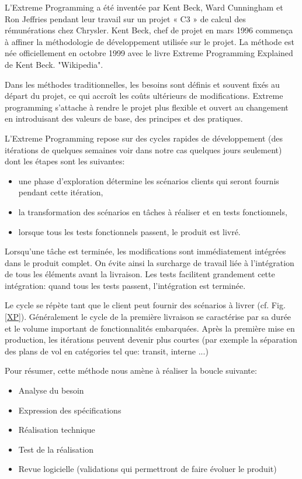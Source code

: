 L'Extreme Programming a été inventée par Kent Beck, Ward Cunningham et Ron Jeffries pendant leur travail sur un projet « C3 » de calcul des rémunérations chez Chrysler. Kent Beck, chef de projet en mars 1996 commença à affiner la méthodologie de développement utilisée sur le projet. La méthode est née officiellement en octobre 1999 avec le livre Extreme Programming Explained de Kent Beck. "Wikipedia".

Dans les méthodes traditionnelles, les besoins sont définis et souvent fixés au départ du projet, ce qui accroît les coûts ultérieurs de modifications. Extreme programming s'attache à rendre le projet plus flexible et ouvert au changement en introduisant des valeurs de base, des principes et des pratiques.

L'Extreme Programming repose sur des cycles rapides de développement (des itérations de quelques semaines voir dans notre cas quelques jours seulement) dont les étapes sont les suivantes:
\begin{itemize}
\item une phase d'exploration détermine les scénarios clients qui seront fournis pendant cette itération,
\item la transformation des scénarios en tâches à réaliser et en tests fonctionnels,
\item lorsque tous les tests fonctionnels passent, le produit est livré.
\end{itemize}\medskip

Lorsqu'une tâche est terminée, les modifications sont immédiatement intégrées dans le produit complet. On évite ainsi la surcharge de travail liée à l'intégration de tous les éléments avant la livraison. Les tests facilitent grandement cette intégration: quand tous les tests passent, l'intégration est terminée.

Le cycle se répète tant que le client peut fournir des scénarios à livrer (cf. Fig. \vref{XP}). Généralement le cycle de la première livraison se caractérise par sa durée et le volume important de fonctionnalités embarquées. Après la première mise en production, les itérations peuvent devenir plus courtes (par exemple la séparation des plans de vol en catégories tel que: transit, interne ...)

Pour résumer, cette méthode nous amène à réaliser la boucle suivante:
\begin{itemize}
\item Analyse du besoin
\item Expression des spécifications
\item Réalisation technique
\item Test de la réalisation
\item Revue logicielle (validations qui permettront de faire évoluer le produit)
\end{itemize}\medskip

